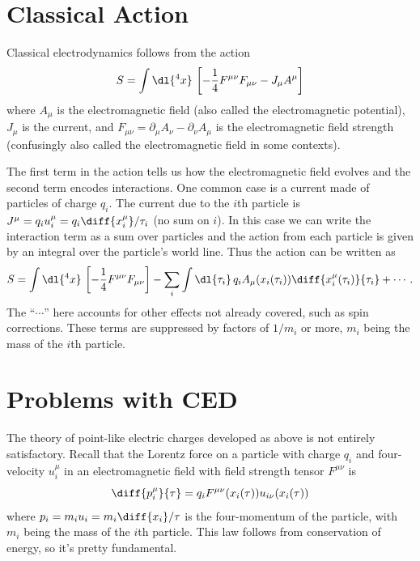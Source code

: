 \documentclass[fleqn]{NotesClass}
\begin{document}
    \section{Classical Action}
    Classical electrodynamics follows from the action
    \begin{equation}
        S = \int \dl{^4x} \, \left[ -\frac{1}{4} F^{\mu\nu}F_{\mu\nu} - J_\mu A^\mu \right]
    \end{equation}
    where \(A_\mu\) is the electromagnetic field (also called the electromagnetic potential), \(J_\mu\) is the current, and \(F_{\mu\nu} = \partial_\mu A_\nu - \partial_\nu A_\mu\) is the electromagnetic field strength (confusingly also called the electromagnetic field in some contexts).
    
    The first term in the action tells us how the electromagnetic field evolves and the second term encodes interactions.
    One common case is a current made of particles of charge \(q_i\).
    The current due to the \(i\)th particle is \(J^\mu = q_i u_i^\mu = q_i \diff{x_i^\mu}/{\tau_i}\) (no sum on \(i\)).
    In this case we can write the interaction term as a sum over particles and the action from each particle is given by an integral over the particle's world line.
    Thus the action can be written as
    \begin{equation}
        S = \int \dl{^4x} \, \left[ -\frac{1}{4}F^{\mu\nu}F_{\mu\nu} \right] - \sum_{i} \int \dl{\tau_i} \, q_i A_\mu(x_i(\tau_i)) \diff{x_i^\mu(\tau_i)}{\tau_i} + \dotsb.
    \end{equation}
    The \enquote{\(\dotsb\)} here accounts for other effects not already covered, such as spin corrections.
    These terms are suppressed by factors of \(1/m_i\) or more, \(m_i\) being the mass of the \(i\)th particle.
    
    \section{Problems with CED}
    The theory of point-like electric charges developed as above is not entirely satisfactory.
    Recall that the Lorentz force on a particle with charge \(q_i\) and four-velocity \(u_i^\mu\) in an electromagnetic field with field strength tensor \(F^{\mu\nu}\) is
    \begin{equation}
        \diff{p_i^\mu}{\tau} = q_i F^{\mu\nu}(x_i(\tau)) u_{i\nu}(x_i(\tau))
    \end{equation}
    where \(p_i = m_i u_i = m_i \diff{x_i}/{\tau}\) is the four-momentum of the particle, with \(m_i\) being the mass of the \(i\)th particle.
    This law follows from conservation of energy, so it's pretty fundamental.
    
\end{document}

